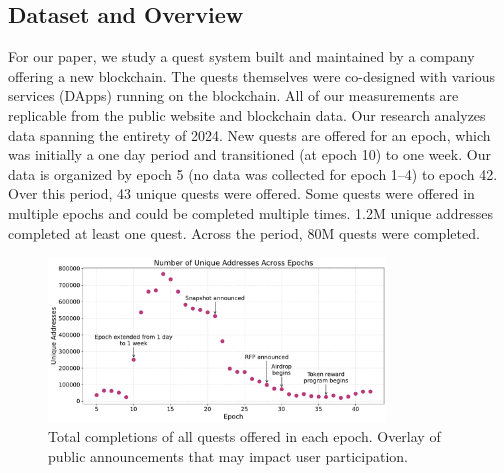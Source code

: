 
\subsection{Dataset and Overview}

For our paper, we study a quest system built and maintained by a company offering a new blockchain. The quests themselves were co-designed with various services (DApps) running on the blockchain. All of our measurements are replicable from the public website and blockchain data. Our research analyzes data spanning the entirety of 2024. New quests are offered for an epoch, which was initially a one day period and transitioned (at epoch 10) to one week. Our data is organized by epoch 5 (no data was collected for epoch 1--4) to epoch 42. Over this period, 43 unique quests were offered. Some quests were offered in multiple epochs and could be completed multiple times. 1.2M unique addresses completed at least one quest.  Across the period, 80M quests were completed.

\begin{figure}[t]
    \centering
    \includegraphics[width=0.8\textwidth]{figures/events.pdf}
    \caption{Total completions of all quests offered in each epoch. Overlay of public announcements that may impact user participation.}
    \label{fig:events}
\end{figure}

